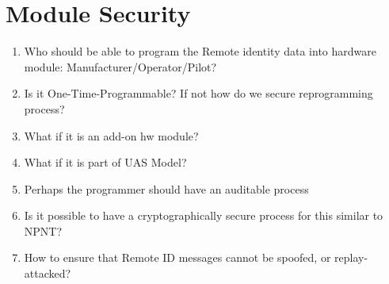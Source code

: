 \documentclass{ua_wgs_base}
\begin{document}
\section{Module Security}
\begin{enumerate}
\item Who should be able to program the Remote identity data into hardware module: Manufacturer/Operator/Pilot?
\item Is it One-Time-Programmable? If not how do we secure reprogramming
process?
\item What if it is an add-on hw module?
\item What if it is part of UAS Model?
\item Perhaps the programmer should have an auditable process
\item Is it possible to have a cryptographically secure process for this
similar to NPNT?
\item How to ensure that Remote ID messages cannot be spoofed, or replay-attacked?
\end{enumerate}
\end{document}
